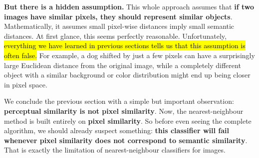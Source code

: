 \highspace
\textcolor{Red2}{ \textbf{But there is a hidden assumption.}} This whole approach assumes that \textbf{if two images have similar pixels, they should represent similar objects}. Mathematically, it assumes small pixel-wise distances imply small semantic distances. At first glance, this seems perfectly reasonable. Unfortunately, \hl{everything we have learned in previous sections tells us that this assumption is often false.} For example, a dog shifted by just a few pixels can have a surprisingly large Euclidean distance from the original image, while a completely different object with a similar background or color distribution might end up being closer in pixel space.

\highspace
We conclude the previous section with a simple but important observation: \textbf{perceptual similarity is not pixel similarity}. Now, the nearest-neighbour method is built entirely on \textbf{pixel similarity}. So before even seeing the complete algorithm, we should already suspect something: \textbf{this classifier will fail whenever pixel similarity does not correspond to semantic similarity}. That is exactly the limitation of nearest-neighbour classifiers for images.